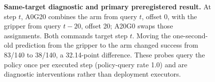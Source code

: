\begin{figure}[t]
\centering
{}
\caption{\textbf{Same-target diagnostic and primary preregistered result.}
At step $t$, A0G20 combines the arm from query $t$, offset 0, with the gripper
from query $t-20$, offset 20; A20G0 swaps those assignments. Both commands
target step $t$. Moving the one-second-old prediction from the gripper to the
arm changed success from 83/140 to 38/140, a 32.14-point difference. These
probes query the policy once per executed step (policy-query rate 1.0) and are
diagnostic interventions rather than deployment executors.}
\label{fig:primary}
\end{figure}

